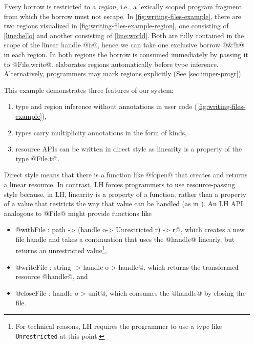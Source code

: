 Every borrow is restricted to a \emph{region}, i.e., a lexically
scoped program fragment from which the borrow must not escape. In
\cref{fig:writing-files-example}, there are two regions visualized in \cref{fig:writing-files-example-region}, one
consisting of \cref{line:hello} and another consisting of
\cref{line:world}. Both are fully contained in the scope of the linear
handle @h@, hence we can take one exclusive borrow @&!h@ in each
region. In both regions the borrow is consumed immediately by passing
it to @File.write@. \lang elaborates regions automatically before type
inference. Alternatively, programmers may mark regions explicitly (See
\cref{sec:imper-progr}).

This example demonstrates three features of our system:
\begin{enumerate}
\item type and region inference without annotations in user code (\cref{fig:writing-files-example}),
\item types carry multiplicity annotations in the form of kinds,
\item resource APIs can be written in direct style as linearity is a
  property of the type @File.t@.
\end{enumerate}

Direct style means that there is a function like @fopen@ that creates
and returns a linear resource. In contrast, LH forces programmers to
use resource-passing style because, in LH, linearity is a property of
a function, rather than a property of a value that restricts the way
that value can be handled (as in \lang). An LH API analogous to @File@
might provide functions like
\begin{itemize}
\item @withFile : path -> (handle o-> Unrestricted r) -> r@, which creates a new
  file handle and takes a continuation that uses the @handle@
  linearly, but returns an unrestricted value\footnote{For technical
    reasons, LH  requires the programmer to use a type like
    \lstinline/Unrestricted/ at this  point.},
\item @writeFile : string -> handle o-> handle@, which
  returns the transformed resource @handle@, and
\item @closeFile : handle o-> unit@, which consumes the @handle@ by
  closing the file.
\end{itemize}


